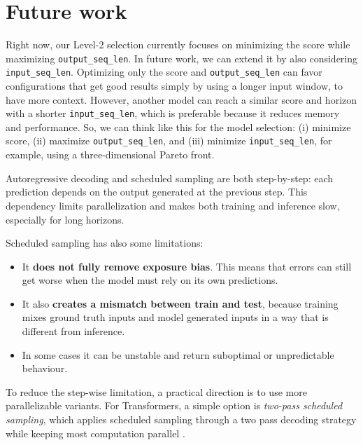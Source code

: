 \section{Future work}
\label{sec:future}



Right now, our Level-2 selection currently focuses on minimizing the score while maximizing \texttt{output\_seq\_len}. In future work, we can extend it by also considering \texttt{input\_seq\_len}. Optimizing only the score and \texttt{output\_seq\_len} can favor configurations that get good results simply by using a longer input window, to have more context. However, another model can reach a similar score and horizon with a shorter \texttt{input\_seq\_len}, which is preferable because it reduces memory and performance. So, we can think like this for the model selection: (i) minimize score, (ii) maximize \texttt{output\_seq\_len}, and (iii) minimize \texttt{input\_seq\_len}, for example, using a three-dimensional Pareto front.


Autoregressive decoding and scheduled sampling are both step-by-step: each prediction depends on the output generated at the previous step. This dependency limits parallelization and makes both training and inference slow, especially for long horizons.

Scheduled sampling has also some limitations:
\begin{itemize}
  \item It \textbf{does not fully remove exposure bias}. This means that errors can still get worse when the model must rely on its own predictions.

  \item It also \textbf{creates a mismatch between train and test}, because training mixes ground truth inputs and model generated inputs in a way that is different from inference.
  
  \item In some cases it can be unstable and return suboptimal or unpredictable behaviour.
  
\end{itemize}

To reduce the step-wise limitation, a practical direction is to use more parallelizable variants. 
For Transformers, a simple option is \emph{two-pass scheduled sampling}, which applies scheduled sampling through a two pass decoding strategy while keeping most computation parallel \cite{mihaylova2019scheduledtransformers}.